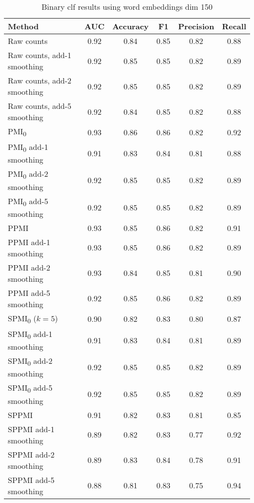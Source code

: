 \documentclass{article}
\begin{document}
\begin{table}[htp]
 \caption{Binary clf results using word embeddings dim 150}
  \centering
  \begin{tabular}{|l|c|c|c|c|c|}
    \hline
    \rowcolor{lightgray} \textbf{Method} & \textbf{AUC} & \textbf{Accuracy} & \textbf{F1} & \textbf{Precision} & \textbf{Recall} \\
    \hline
    Raw counts & 0.92 & 0.84 & 0.85 & \cellcolor{green} 0.82 & 0.88 \\
    \hline
    Raw counts, add-1 smoothing & 0.92 & 0.85 & 0.85 & \cellcolor{green} 0.82 & 0.89 \\
    \hline
    Raw counts, add-2 smoothing & 0.92 & 0.85 & 0.85 & \cellcolor{green} 0.82 & 0.89 \\
    \hline
    Raw counts, add-5 smoothing & 0.92 & 0.84 & 0.85 & \cellcolor{green} 0.82 & 0.88 \\
    \hline
    \cellcolor{green} PMI\textsubscript{0} & \cellcolor{green} 0.93 & \cellcolor{green} 0.86 & \cellcolor{green} 0.86 & \cellcolor{green} 0.82 & 0.92 \\
    \hline
    PMI\textsubscript{0} add-1 smoothing & 0.91 & 0.83 & 0.84 & 0.81 & 0.88 \\
    \hline
    PMI\textsubscript{0} add-2 smoothing & 0.92 & 0.85 & 0.85 & \cellcolor{green} 0.82 & 0.89 \\
    \hline
    PMI\textsubscript{0} add-5 smoothing & 0.92 & 0.85 & 0.85 & \cellcolor{green} 0.82 & 0.89 \\
    \hline
    PPMI & \cellcolor{green} 0.93 & 0.85 & \cellcolor{green} 0.86 & \cellcolor{green} 0.82 & 0.91 \\
    \hline
    PPMI add-1 smoothing & \cellcolor{green} 0.93 & 0.85 & \cellcolor{green} 0.86 & \cellcolor{green} 0.82 & 0.89 \\
    \hline
    PPMI add-2 smoothing & \cellcolor{green} 0.93 & 0.84 & 0.85 & 0.81 & 0.90 \\
    \hline
    PPMI add-5 smoothing & 0.92 & 0.85 & 0.86 & \cellcolor{green} 0.82 & 0.89 \\
    \hline
    SPMI\textsubscript{0} ($k=5$) & 0.90 & 0.82 & 0.83 & 0.80 & 0.87 \\
    \hline
    SPMI\textsubscript{0} add-1 smoothing & 0.91 & 0.83 & 0.84 & 0.81 & 0.89 \\
    \hline
    SPMI\textsubscript{0} add-2 smoothing & 0.92 & 0.85 & 0.85 & \cellcolor{green} 0.82 & 0.89 \\
    \hline
    SPMI\textsubscript{0} add-5 smoothing & 0.92 & 0.85 & 0.85 & \cellcolor{green} 0.82 & 0.89 \\
    \hline
    SPPMI & 0.91 & 0.82 & 0.83 & 0.81 & 0.85 \\
    \hline
    SPPMI add-1 smoothing & 0.89 & 0.82 & 0.83 & 0.77 & 0.92 \\
    \hline
    SPPMI add-2 smoothing & 0.89 & 0.83 & 0.84 & 0.78 & 0.91 \\
    \hline
    SPPMI add-5 smoothing & 0.88 & 0.81 & 0.83 & 0.75 & \cellcolor{green} 0.94 \\
    \hline
  \end{tabular}
  \label{tab:wemb150}
\end{table}
\end{document}
